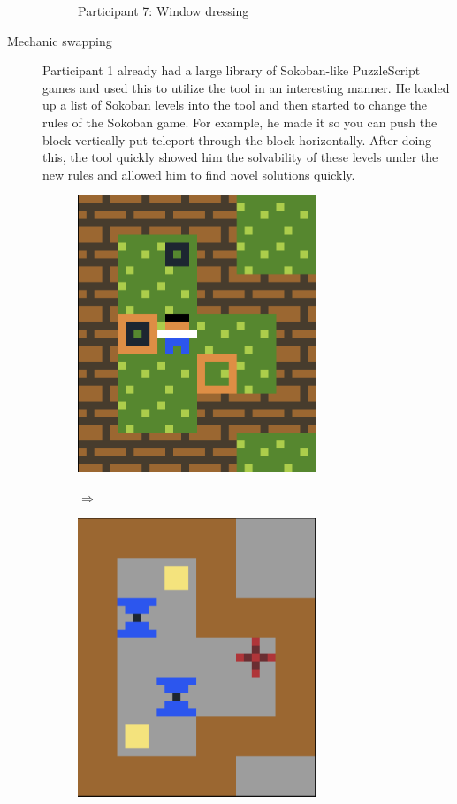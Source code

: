 \begin{description}
\begin{figure}[!htbp]
\begin{minipage}[t]{0.25\textwidth}
\end{minipage}
\caption{Participant 7: Window dressing}
\end{figure}
    

\item[Mechanic swapping] Participant 1 already had a large library of Sokoban-like PuzzleScript games and used this to utilize the tool in an interesting manner. He loaded up a list of Sokoban levels into the tool and then started to change the rules of the Sokoban game. For example, he made it so you can push the block vertically put teleport through the block horizontally. After doing this, the tool quickly showed him the solvability of these levels under the new rules and allowed him to find novel solutions quickly.

\begin{figure}[!htbp]
\begin{minipage}{0.5\textwidth}
\centering
\includegraphics[width=0.7\textwidth]{figures/rulebasedimprovingfrom.png}
\end{minipage}  $\Longrightarrow$ \hfill
\begin{minipage}{0.5\textwidth}
\centering
\includegraphics[width=0.7\textwidth]{figures/rulebasedimprovingto.png}

\end{minipage}
\end{figure}
\end{description}
